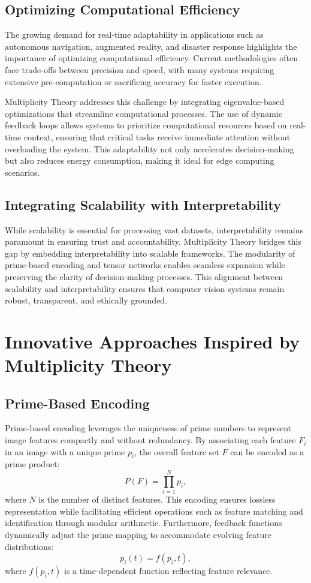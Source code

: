 \documentclass{article}
\theoremstyle{plain}
\begin{document}
\subsection{Optimizing Computational Efficiency}
The growing demand for real-time adaptability in applications such as autonomous navigation, augmented reality, and disaster response highlights the importance of optimizing computational efficiency. Current methodologies often face trade-offs between precision and speed, with many systems requiring extensive pre-computation or sacrificing accuracy for faster execution.

Multiplicity Theory addresses this challenge by integrating eigenvalue-based optimizations that streamline computational processes. The use of dynamic feedback loops allows systems to prioritize computational resources based on real-time context, ensuring that critical tasks receive immediate attention without overloading the system. This adaptability not only accelerates decision-making but also reduces energy consumption, making it ideal for edge computing scenarios.

\subsection{Integrating Scalability with Interpretability}
While scalability is essential for processing vast datasets, interpretability remains paramount in ensuring trust and accountability. Multiplicity Theory bridges this gap by embedding interpretability into scalable frameworks. The modularity of prime-based encoding and tensor networks enables seamless expansion while preserving the clarity of decision-making processes. This alignment between scalability and interpretability ensures that computer vision systems remain robust, transparent, and ethically grounded.

\section{Innovative Approaches Inspired by Multiplicity Theory}

\subsection{Prime-Based Encoding}
Prime-based encoding leverages the uniqueness of prime numbers to represent image features compactly and without redundancy. By associating each feature \( F_i \) in an image with a unique prime \( p_i \), the overall feature set \( F \) can be encoded as a prime product:
\begin{equation}
P(F) = \prod_{i=1}^N p_i,
\end{equation}
where \( N \) is the number of distinct features. This encoding ensures lossless representation while facilitating efficient operations such as feature matching and identification through modular arithmetic. Furthermore, feedback functions dynamically adjust the prime mapping to accommodate evolving feature distributions:
\begin{equation}
p_i(t) = f(p_i, t),
\end{equation}
where \( f(p_i, t) \) is a time-dependent function reflecting feature relevance.
\end{document}
